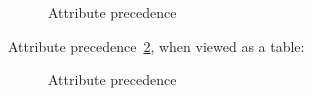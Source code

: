 \begin{figure}[ht!]
  \caption{Attribute precedence}
  \label{fig:overview_chef_attributes_precedence}
\end{figure}

Attribute precedence~\ref{fig:overview_chef_attributes_table}, when viewed as a table:

\begin{figure}[ht!]
  \caption{Attribute precedence}
  \label{fig:overview_chef_attributes_table}
\end{figure}
